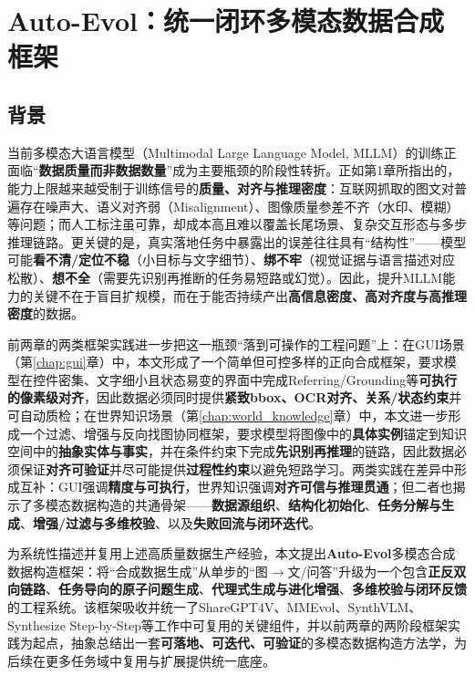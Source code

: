 \chapter{Auto-Evol：统一闭环多模态数据合成框架}

\section{背景}
当前多模态大语言模型（Multimodal Large Language Model, MLLM）的训练正面临“\textbf{数据质量而非数据数量}”成为主要瓶颈的阶段性转折。正如第1章所指出的，能力上限越来越受制于训练信号的\textbf{质量、对齐与推理密度}：互联网抓取的图文对普遍存在噪声大、语义对齐弱（Misalignment）、图像质量参差不齐（水印、模糊）等问题；而人工标注虽可靠，却成本高且难以覆盖长尾场景、复杂交互形态与多步推理链路。更关键的是，真实落地任务中暴露出的误差往往具有“结构性”——模型可能\textbf{看不清/定位不稳}（小目标与文字细节）、\textbf{绑不牢}（视觉证据与语言描述对应松散）、\textbf{想不全}（需要先识别再推断的任务易短路或幻觉）。因此，提升MLLM能力的关键不在于盲目扩规模，而在于能否持续产出\textbf{高信息密度、高对齐度与高推理密度}的数据\citep{chen2023sharegpt4v,xu2024mmevol,liu2025synthvlm}。

前两章的两类框架实践进一步把这一瓶颈“落到可操作的工程问题”上：在GUI场景（第\ref{chap:gui}章）中，本文形成了一个简单但可控多样的正向合成框架，要求模型在控件密集、文字细小且状态易变的界面中完成Referring/Grounding等\textbf{可执行的像素级对齐}，因此数据必须同时提供\textbf{紧致bbox、OCR对齐、关系/状态约束}并可自动质检；在世界知识场景（第\ref{chap:world_knowledge}章）中，本文进一步形成一个过滤、增强与反向找图协同框架，要求模型将图像中的\textbf{具体实例}锚定到知识空间中的\textbf{抽象实体与事实}，并在条件约束下完成\textbf{先识别再推理}的链路，因此数据必须保证\textbf{对齐可验证}并尽可能提供\textbf{过程性约束}以避免短路学习。两类实践在差异中形成互补：GUI强调\textbf{精度与可执行}，世界知识强调\textbf{对齐可信与推理贯通}；但二者也揭示了多模态数据构造的共通骨架——\textbf{数据源组织}、\textbf{结构化初始化}、\textbf{任务分解与生成}、\textbf{增强/过滤与多维校验}、以及\textbf{失败回流与闭环迭代}。

为系统性描述并复用上述高质量数据生产经验，本文提出\textbf{Auto-Evol}多模态合成数据构造框架：将“合成数据生成”从单步的“图$\rightarrow$文/问答”升级为一个包含\textbf{正反双向链路}、\textbf{任务导向的原子问题生成}、\textbf{代理式生成与进化增强}、\textbf{多维校验与闭环反馈}的工程系统。该框架吸收并统一了ShareGPT4V、MMEvol、SynthVLM、Synthesize Step-by-Step等工作中可复用的关键组件\citep{chen2023sharegpt4v,xu2024mmevol,liu2025synthvlm,li2024synthesize}，并以前两章的两阶段框架实践为起点，抽象总结出一套\textbf{可落地、可迭代、可验证}的多模态数据构造方法学，为后续在更多任务域中复用与扩展提供统一底座。

